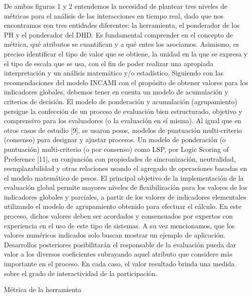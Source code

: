 De ambas figuras 1 y 2 entendemos la necesidad de plantear tres niveles de métricas para el análisis de las interacciones en tiempo real, dado que nos encontramos con tres entidades diferentes: la herramienta, el ponderador de los PH y el ponderador del DHD.
Es fundamental comprender en el concepto de métrica, qué atributos se cuantifican y a qué entes los asociamos. Asimismo, es preciso identificar el tipo de valor que se obtiene, la unidad en la que se expresa y el tipo de escala que se usa, con el fin de poder realizar una apropiada interpretación y un análisis matemático y/o estadístico.
Siguiendo con las recomendaciones del modelo INCAMI con el propósito de obtener valores para los indicadores globales, debemos tener en cuenta un modelo de acumulación y criterios de decisión. El modelo de ponderación y acumulación (agrupamiento) persigue la confección  de un proceso de evaluación bien estructurado, objetivo y comprensivo para los evaluadores (o la evaluación en sí misma). Al igual que en otros casos de estudio [9], se usaron pesos, modelos de puntuación multi-criterio (consenso)  para designar y ajustar procesos. Un modelo de ponderación (o puntuación) multi-criterio (o por consenso) como LSP, por Logic Scoring of Preference [11], en conjunción con propiedades de sincronización, neutralidad, reemplazabilidad y otras relaciones usando el agregado de operaciones basadas en el modelo matemático de pesos.
El principal objetivo de la implementación de la evaluación global permite mayores niveles de flexibilización para los valores de los indicadores globales y parciales, a partir de los valores de indicadores elementales utilizando el modelo de agrupamiento obtenido para efectuar el cálculo. En este proceso, dichos valores deben ser acordados y consensuados por expertos con experiencia en el uso de este tipo de sistemas. A su vez mencionamos, que los valores numéricos indicados solo buscan mostrar un ejemplo de aplicación. Desarrollos posteriores posibilitarán el responsable de la evaluación pueda dar valor a los diversos coeficientes subrayando aquel atributo que considere más importante en el proceso. En cada caso, el valor resultado brinda una medida sobre el grado de interactividad de la participación.

Métrica de la herramienta

